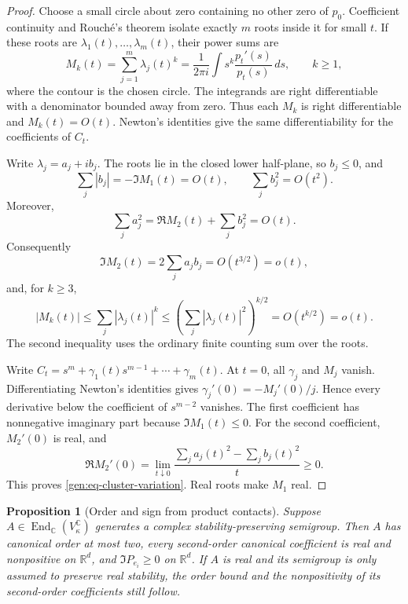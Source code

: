 \documentclass[reqno]{amsart}
\newtheorem{proposition}[theorem]{Proposition}
\theoremstyle{definition}
\theoremstyle{remark}
\newcommand{\C}{\mathbb C}
\newcommand{\R}{\mathbb R}
\begin{document}
\begin{proof}
Choose a small circle about zero containing no other zero of \(p_0\).
Coefficient continuity and Rouch\'e's theorem isolate exactly \(m\)
roots inside it for small \(t\).  If these roots are
\(\lambda_1(t),\ldots,\lambda_m(t)\), their power sums are
\[
 M_k(t)=\sum_{j=1}^m\lambda_j(t)^k
       =\frac1{2\pi i}\int s^k\frac{p_t'(s)}{p_t(s)}\,ds,
       \qquad k\geq1,
\]
where the contour is the chosen circle.  The integrands are right
differentiable with a denominator bounded away from zero.
Thus each \(M_k\) is right differentiable and \(M_k(t)=O(t)\).
Newton's identities give the same differentiability for the coefficients
of \(C_t\).

Write \(\lambda_j=a_j+ib_j\).  The roots lie in the closed lower
half-plane, so \(b_j\leq0\), and
\[
 \sum_j|b_j|=-\Im M_1(t)=O(t),\qquad
 \sum_jb_j^2=O(t^2).
\]
Moreover,
\[
 \sum_ja_j^2=\Re M_2(t)+\sum_jb_j^2=O(t).
\]
Consequently
\[
 \Im M_2(t)=2\sum_ja_jb_j=O(t^{3/2})=o(t),
\]
and, for \(k\geq3\),
\[
 |M_k(t)|
 \leq\sum_j|\lambda_j(t)|^k
 \leq\left(\sum_j|\lambda_j(t)|^2\right)^{k/2}
 =O(t^{k/2})=o(t).
\]
The second inequality uses the ordinary finite counting sum over
the roots.

Write
\(C_t=s^m+\gamma_1(t)s^{m-1}+\cdots+\gamma_m(t)\).
At \(t=0\), all \(\gamma_j\) and \(M_j\) vanish.
Differentiating Newton's identities gives
\(\gamma_j'(0)=-M_j'(0)/j\).
Hence every derivative below the coefficient of \(s^{m-2}\)
vanishes.  The first coefficient has nonnegative imaginary part
because \(\Im M_1(t)\leq0\).
For the second coefficient, \(M_2'(0)\) is real, and
\[
 \Re M_2'(0)=\lim_{t\downarrow0}
       \frac{\sum_ja_j(t)^2-\sum_jb_j(t)^2}{t}\geq0.
\]
This proves \eqref{gen:eq-cluster-variation}.  Real roots make
\(M_1\) real.
\end{proof}

\begin{proposition}[Order and sign from product contacts]
\label{gen:contact-necessity}
Suppose \(A\in\operatorname{End}_{\C}(V_\kappa^\C)\) generates a
complex stability-preserving semigroup.  Then \(A\) has canonical
order at most two, every second-order canonical coefficient is real
and nonpositive on \(\R^d\), and
\(\Im P_{e_i}\geq0\) on \(\R^d\).
If \(A\) is real and its semigroup is only assumed to preserve real
stability, the order bound and the nonpositivity of its
second-order coefficients still follow.
\end{proposition}
\end{document}

